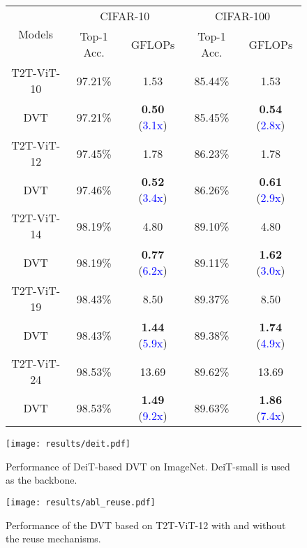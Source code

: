 \documentclass{article}
\begin{document}
\begin{figure}[t]
\begin{center}
\begin{minipage}{0.555\columnwidth}
\begin{footnotesize}
{{\begin{tabular}{c|cc|cc}
    \multirow{2}{*}{Models} & \multicolumn{2}{c}{CIFAR-10} & \multicolumn{2}{|c}{CIFAR-100} \\
    & Top-1 Acc. & GFLOPs  & Top-1 Acc. & GFLOPs \\
    \midrule
    T2T-ViT-10 & 97.21\% & {1.53} & 85.44\% & 1.53 \\
    DVT & 97.21\% & \textbf{0.50} (\textcolor{blue}{3.1x}) & 85.45\% & \textbf{0.54} (\textcolor{blue}{2.8x}) \\
    \midrule
    T2T-ViT-12 & 97.45\% & {1.78} & 86.23\% & 1.78 \\
    DVT & 97.46\% & \textbf{0.52} (\textcolor{blue}{3.4x}) & 86.26\% & \textbf{0.61} (\textcolor{blue}{2.9x}) \\
    \midrule
    T2T-ViT-14 & 98.19\% & {4.80} & 89.10\% & 4.80 \\
    DVT & 98.19\% & \textbf{0.77} (\textcolor{blue}{6.2x}) & 89.11\% & \textbf{1.62} (\textcolor{blue}{3.0x}) \\
    \midrule
    T2T-ViT-19 & 98.43\% & {8.50} & 89.37\% & 8.50 \\
    DVT & 98.43\% & \textbf{1.44} (\textcolor{blue}{5.9x}) & 89.38\% & \textbf{1.74} (\textcolor{blue}{4.9x}) \\
    \midrule
    T2T-ViT-24 & 98.53\% & {13.69} & 89.62\% & 13.69 \\
    DVT & 98.53\% & \textbf{1.49} (\textcolor{blue}{9.2x}) & 89.63\% & \textbf{1.86} (\textcolor{blue}{7.4x}) \\
    \bottomrule
    \end{tabular}}}
    \end{footnotesize}
    \end{minipage}
    \end{center}
    \vskip -0.3in
 \end{figure}






\begin{figure*}[t]
    \begin{center}
        \begin{minipage}{0.49\columnwidth}
            \hspace{-0.075in}
            \texttt{[image: results/deit.pdf]}
            \vskip -0.12in
            \caption{Performance of DeiT-based DVT on ImageNet. DeiT-small is used as the backbone.
        }\label{fig:deit}
    \end{minipage}
    \hspace{0.01in}
    \begin{minipage}{0.49\columnwidth}
        \hspace{-0.075in}
\texttt{[image: results/abl\_reuse.pdf]}
        \vskip -0.12in
        \caption{Performance of the DVT based on T2T-ViT-12 with and without the reuse mechanisms. 
    }\label{fig:abl_reuse}
    \end{minipage}
    \end{center}
    \vskip -0.245in
 \end{figure*}
\end{document}

